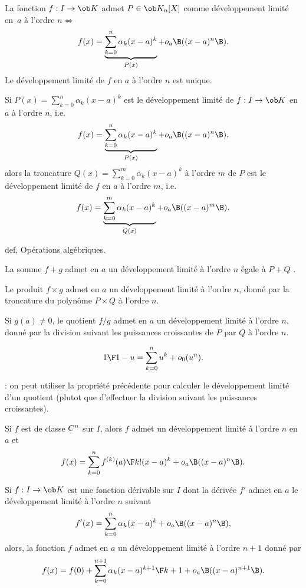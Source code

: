 \Definition [$a\in i$ intervalle] 
La fonction $f:I\to\ob K$ admet $P\in\ob K_n[X]$ comme d\'eveloppement limit\'e en~$a$ \`a l'ordre $n\Leftrightarrow$ 
$$
f(x)=\underbrace{\sum_{k=0}^n\alpha_k(x-a)^k}_{P(x)}+o_a\B((x-a)^n\B).
$$
Le d\'eveloppement limit\'e de $f$ en $a$ \`a l'ordre $n$ est unique. 
\bigskip

\Propriete [$a\in i$ intervalle, $0\le m\le n$] 
Si $P(x)=\sum_{k=0}^n\alpha_k(x-a)^k$ est le d\'eveloppement limit\'e de $f:I\to\ob K$ en $a$ \`a l'ordre $n$, i.e. 
$$
f(x)=\underbrace{\sum_{k=0}^n\alpha_k(x-a)^k}_{P(x)}+o_a\B((x-a)^n\B), 
$$
alors la troncature $Q(x)=\sum_{k=0}^m\alpha_k(x-a)^k$ \`a l'ordre $m$ de $P$ est le d\'eveloppement limit\'e 
de $f$ en $a$ \`a l'ordre $m$, i.e. 
$$
f(x)=\underbrace{\sum_{k=0}^m\alpha_k(x-a)^k}_{Q(x)}+o_a\B((x-a)^m\B).
$$


\Subsection def, Op\'erations alg\'ebriques. 

La somme $f+g$ admet en $a$ un d\'eveloppement limit\'e \`a l'ordre $n$ \'egale \`a $P+Q$ . 


Le produit $f\times g$ admet en $a$ un d\'eveloppement limit\'e \`a l'ordre $n$, donn\'e par la troncature du polyn\^ome $P\times Q$ \`a l'ordre $n$. 

Si $g(a)\neq0$, le quotient $f/g$ admet en $a$ un d\'eveloppement limit\'e \`a l'ordre $n$, donn\'e par la division suivant les puissances croissantes de $P$ par $Q$ \`a l'ordre $n$. 


\Propriete [$n\ge0$] 
$$
{1\F 1-u}=\sum_{k=0}^nu^k+o_0(u^n).
$$

\Remarque : on peut utiliser la propri\'et\'e pr\'ec\'edente pour calculer le d\'eveloppement limit\'e d'un quotient (plutot que d'effectuer la division suivant les puissances croissantes). 
\bigskip

\Theoreme [$a\in I$ intervalle]
Si $f$ est de classe $\sc C^n$ sur $I$, alors $f$ admet un d\'eveloppement limit\'e \`a l'ordre $n$ en $a$ et 
$$
f(x)=\sum_{k=0}^n{f^{(k)}(a)\F k!}(x-a)^k+o_a\B((x-a)^n\B).
$$

\Propriete [$a\in I$ intervalle]
Si $f:I\to\ob K$ est une fonction d\'erivable sur $I$ dont la d\'eriv\'ee $f'$ admet en $a$ le d\'eveloppement limit\'e \`a l'ordre $n$ suivant 
$$
f'(x)=\sum_{k=0}^n\alpha_k(x-a)^k+o_a\B((x-a)^n\B), 
$$
alors, la fonction $f$ admet en $a$ un d\'eveloppement limit\'e \`a l'ordre $n+1$ donn\'e par 
$$
f(x)=f(0)+\sum_{k=0}^{n+1}\alpha_k{(x-a)^{k+1}\F k+1}+o_a\B((x-a)^{n+1}\B).
$$

